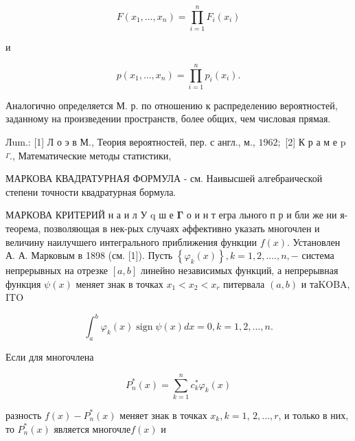 \documentclass[10pt]{article}
\begin{document}
\[

F\left(x_{1}, \ldots, x_{n}\right)=\prod_{i=1}^{n} F_{i}\left(x_{i}\right)

\]



и



\[

p\left(x_{1}, \ldots, x_{n}\right)=\prod_{i=1}^{n} p_{i}\left(x_{i}\right) .

\]



Аналогично определяется М. р. по отношению к распределению вероятностей, заданному на произведении пространств, более общих, чем числовая прямая.



Лum.: [1] Л о э в М., Теория вероятностей, пер. с англ., м., $1962 ;$ [2] К р а м е p $\stackrel{\Gamma}{ }$., Математические методы статистики,



МАРКОВА КВАДРАТУРНАЯ ФОРМУЛА - см. Наивысшей алгебраической степени точности квадратурная бормула.



МАРКОВА КРИТЕРИЙ н а и л У q ш $е$ $\boldsymbol{\Gamma}$ о и н т егра льного п р и бли же ни я- теорема, позволяющая в нек-рых случаях әффективно указать многочлен и величину наилучшего интегрального приближения функции $f(x)$. Установлен А. А. Марковым в 1898 (см. [1]). Пусть $\left\{\varphi_{k}(x)\right\}, k=1,2, \ldots ., n,-$ система непрерывных на отрезке $[a, b]$ линейно независимых функций, а непрерывная функция $\psi(x)$ меняет знак в точках $x_{1}<x_{2}<x_{r}$ питервала $(a, b)$ и таKOBA, ITO



\[

\int_{a}^{b} \varphi_{k}(x) \operatorname{sign} \psi(x) d x=0, k=1,2, \ldots, n .

\]



Если для многочлена



\[

P_{n}^{*}(x)=\sum_{k=1}^{n} c_{k}^{*} \varphi_{k}(x)

\]



разность $f(x)-P_{n}^{*}(x)$ меняет знак в точках $x_{k}, k=1$, $2, \ldots, r$, и только в них, то $P_{n}^{*}(x)$ является многочле$f(x)$ и
\end{document}
